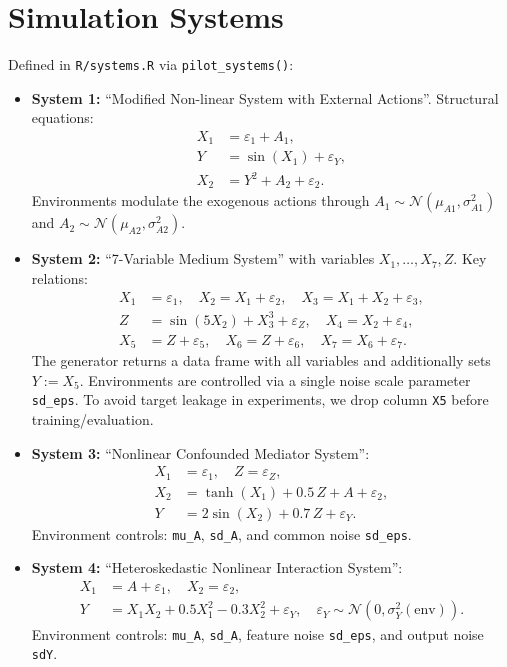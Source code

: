\documentclass[11pt,a4paper]{article}
\begin{document}
\section{Simulation Systems}
Defined in \texttt{R/systems.R} via \texttt{pilot\_systems()}:
\begin{itemize}
  \item \textbf{System 1:} ``Modified Non-linear System with External Actions''. Structural equations:
    \begin{align}
      X_1 &= \varepsilon_1 + A_1, \\
      Y   &= \sin(X_1) + \varepsilon_Y, \\
      X_2 &= Y^2 + A_2 + \varepsilon_2.
    \end{align}
    Environments modulate the exogenous actions through \(A_1 \sim \mathcal{N}(\mu_{A1}, \sigma_{A1}^2)\) and \(A_2 \sim \mathcal{N}(\mu_{A2}, \sigma_{A2}^2)\).
  \item \textbf{System 2:} ``7-Variable Medium System'' with variables \(X_1,\ldots,X_7, Z\). Key relations:
    \begin{align}
      X_1 &= \varepsilon_1, \quad X_2 = X_1 + \varepsilon_2, \quad X_3 = X_1 + X_2 + \varepsilon_3, \\
      Z   &= \sin(5X_2) + X_3^3 + \varepsilon_Z, \quad X_4 = X_2 + \varepsilon_4, \\
      X_5 &= Z + \varepsilon_5, \quad X_6 = Z + \varepsilon_6, \quad X_7 = X_6 + \varepsilon_7.
    \end{align}
    The generator returns a data frame with all variables and additionally sets \(Y := X_5\). Environments are controlled via a single noise scale parameter \texttt{sd\_eps}. To avoid target leakage in experiments, we drop column \texttt{X5} before training/evaluation.
  \item \textbf{System 3:} ``Nonlinear Confounded Mediator System'':
    \begin{align}
      X_1 &= \varepsilon_1, \quad Z = \varepsilon_Z, \\
      X_2 &= \tanh(X_1) + 0.5\,Z + A + \varepsilon_2, \\
      Y   &= 2\sin(X_2) + 0.7\,Z + \varepsilon_Y.
    \end{align}
    Environment controls: \texttt{mu\_A}, \texttt{sd\_A}, and common noise \texttt{sd\_eps}.
  \item \textbf{System 4:} ``Heteroskedastic Nonlinear Interaction System'':
    \begin{align}
      X_1 &= A + \varepsilon_1, \quad X_2 = \varepsilon_2, \\
      Y   &= X_1X_2 + 0.5X_1^2 - 0.3X_2^2 + \varepsilon_Y, \quad \varepsilon_Y \sim \mathcal{N}(0, \sigma_Y^2(\text{env})).
    \end{align}
    Environment controls: \texttt{mu\_A}, \texttt{sd\_A}, feature noise \texttt{sd\_eps}, and output noise \texttt{sdY}.
\end{itemize}
\end{document}
